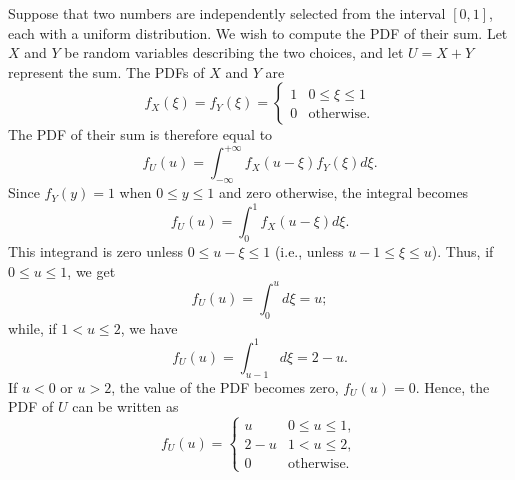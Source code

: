 \begin{example}
Suppose that two numbers are independently selected from the interval $[0,1]$, each with a uniform distribution.
We wish to compute the PDF of their sum.
Let $X$ and $Y$ be random variables describing the two choices, and let $U = X + Y$ represent the sum.
The PDFs of $X$ and $Y$ are
\begin{equation*}
f_X(\xi) = f_Y(\xi)
= \begin{cases} 1 & 0 \leq \xi \leq 1 \\
0 & \text{otherwise} . \end{cases}
\end{equation*}
The PDF of their sum is therefore equal to
\begin{equation*}
f_U(u) = \int_{-\infty}^{+\infty} f_X(u - \xi) f_Y(\xi) d\xi .
\end{equation*}
Since $f_Y(y) = 1$ when $0 \leq y \leq 1$ and zero otherwise, the integral becomes
\begin{equation*}
f_U(u) = \int_0^1 f_X(u - \xi) d\xi .
\end{equation*}
This integrand is zero unless $0 \leq u - \xi \leq 1$ (i.e., unless $u - 1 \leq \xi \leq u$).
Thus, if $0 \leq u \leq 1$, we get
\begin{equation*}
f_U(u) = \int_0^u d\xi = u ;
\end{equation*}
while, if $1 < u \leq 2$, we have
\begin{equation*}
f_U(u) = \int_{u - 1}^1 d\xi = 2 - u .
\end{equation*}
If $u < 0$ or $u > 2$, the value of the PDF becomes zero, $f_U(u) = 0$.
Hence, the PDF of $U$ can be written as
\begin{equation*}
f_U(u) = \begin{cases} u & 0 \leq u \leq 1, \\
2-u & 1 < u \leq 2, \\
0 & \text{otherwise} . \end{cases}
\end{equation*}
\end{example}


